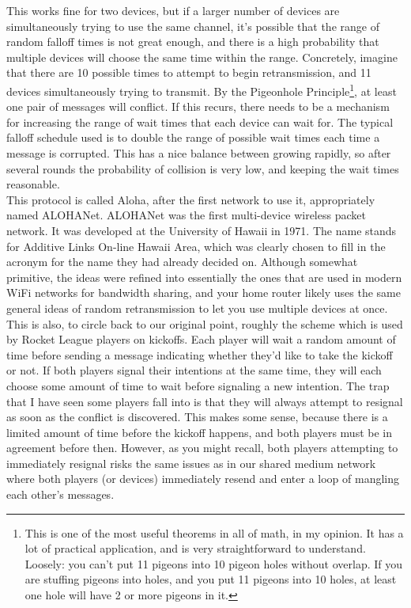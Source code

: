 \documentclass{article}
\begin{document}
This works fine for two devices, but if a larger number of devices are simultaneously trying to use the same channel, it’s possible that the range of random falloff times is not great enough, and there is a high probability that multiple devices will choose the same time within the range. Concretely, imagine that there are 10 possible times to attempt to begin retransmission, and 11 devices simultaneously trying to transmit. By the Pigeonhole Principle\footnote{This is one of the most useful theorems in all of math, in my opinion. It has a lot of practical application, and is very straightforward to understand. Loosely: you can’t put 11 pigeons into 10 pigeon holes without overlap. If you are stuffing pigeons into holes, and you put 11 pigeons into 10 holes, at least one hole will have 2 or more pigeons in it.}, at least one pair of messages will conflict. If this recurs, there needs to be a mechanism for increasing the range of wait times that each device can wait for. The typical falloff schedule used is to double the range of possible wait times each time a message is corrupted. This has a nice balance between growing rapidly, so after several rounds the probability of collision is very low, and keeping the wait times reasonable.\\

This protocol is called Aloha, after the first network to use it, appropriately named ALOHANet. ALOHANet was the first multi-device wireless packet network. It was developed at the University of Hawaii in 1971. The name stands for Additive Links On-line Hawaii Area, which was clearly chosen to fill in the acronym for the name they had already decided on. Although somewhat primitive, the ideas were refined into essentially the ones that are used in modern WiFi networks for bandwidth sharing, and your home router likely uses the same general ideas of random retransmission to let you use multiple devices at once.\\

This is also, to circle back to our original point, roughly the scheme which is used by Rocket League players on kickoffs. Each player will wait a random amount of time before sending a message indicating whether they’d like to take the kickoff or not. If both players signal their intentions at the same time, they will each choose some amount of time to wait before signaling a new intention. The trap that I have seen some players fall into is that they will always attempt to resignal as soon as the conflict is discovered. This makes some sense, because there is a limited amount of time before the kickoff happens, and both players must be in agreement before then. However, as you might recall, both players attempting to immediately resignal risks the same issues as in our shared medium network where both players (or devices) immediately resend and enter a loop of mangling each other’s messages.\\
\end{document}
